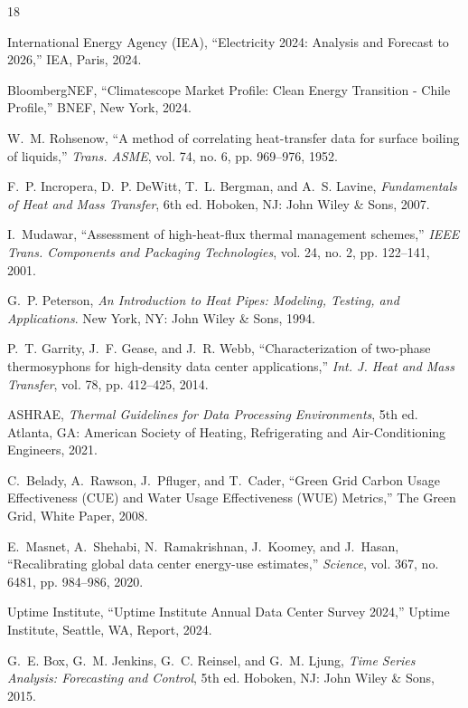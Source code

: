 \documentclass[journal]{IEEEtran}
\begin{document}
\begin{thebibliography}{18}

International Energy Agency (IEA), ``Electricity 2024: Analysis and Forecast to 2026,'' IEA, Paris, 2024.

BloombergNEF, ``Climatescope Market Profile: Clean Energy Transition - Chile Profile,'' BNEF, New York, 2024.

W.~M. Rohsenow, ``A method of correlating heat-transfer data for surface boiling of liquids,'' {\em Trans. ASME}, vol. 74, no. 6, pp. 969--976, 1952.

F.~P. Incropera, D.~P. DeWitt, T.~L. Bergman, and A.~S. Lavine, {\em Fundamentals of Heat and Mass Transfer}, 6th ed. Hoboken, NJ: John Wiley \& Sons, 2007.

I.~Mudawar, ``Assessment of high-heat-flux thermal management schemes,'' {\em IEEE Trans. Components and Packaging Technologies}, vol. 24, no. 2, pp. 122--141, 2001.

G.~P. Peterson, {\em An Introduction to Heat Pipes: Modeling, Testing, and Applications}. New York, NY: John Wiley \& Sons, 1994.

P.~T. Garrity, J.~F. Gease, and J.~R. Webb, ``Characterization of two-phase thermosyphons for high-density data center applications,'' {\em Int. J. Heat and Mass Transfer}, vol. 78, pp. 412--425, 2014.

ASHRAE, {\em Thermal Guidelines for Data Processing Environments}, 5th ed. Atlanta, GA: American Society of Heating, Refrigerating and Air-Conditioning Engineers, 2021.

C.~Belady, A.~Rawson, J.~Pfluger, and T.~Cader, ``Green Grid Carbon Usage Effectiveness (CUE) and Water Usage Effectiveness (WUE) Metrics,'' The Green Grid, White Paper, 2008.

E.~Masnet, A.~Shehabi, N.~Ramakrishnan, J.~Koomey, and J.~Hasan, ``Recalibrating global data center energy-use estimates,'' {\em Science}, vol. 367, no. 6481, pp. 984--986, 2020.

Uptime Institute, ``Uptime Institute Annual Data Center Survey 2024,'' Uptime Institute, Seattle, WA, Report, 2024.

G.~E. Box, G.~M. Jenkins, G.~C. Reinsel, and G.~M. Ljung, {\em Time Series Analysis: Forecasting and Control}, 5th ed. Hoboken, NJ: John Wiley \& Sons, 2015.


\end{thebibliography}
\end{document}
